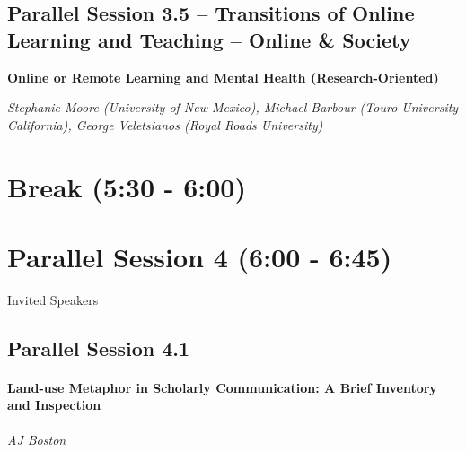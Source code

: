 \documentclass[
]{book}
\begin{document}
\hypertarget{parallel-session-3.5-transitions-of-online-learning-and-teaching-online-society}{%
\subsection*{Parallel Session 3.5 -- Transitions of Online Learning and Teaching -- Online \& Society}\label{parallel-session-3.5-transitions-of-online-learning-and-teaching-online-society}}

\begin{secondary}
\textbf{Online or Remote Learning and Mental Health (Research-Oriented)}

\emph{Stephanie Moore (University of New Mexico), Michael Barbour (Touro
University California), George Veletsianos (Royal Roads University)}
\end{secondary}

\hypertarget{break-530---600}{%
\section*{Break (5:30 - 6:00)}\label{break-530---600}}

\hypertarget{parallel-session-4-600---645}{%
\section*{Parallel Session 4 (6:00 - 6:45)}\label{parallel-session-4-600---645}}

Invited Speakers

\hypertarget{parallel-session-4.1}{%
\subsection*{Parallel Session 4.1}\label{parallel-session-4.1}}

\begin{reflect}
\hypertarget{land-use-metaphor-in-scholarly-communication-a-brief-inventory-and-inspection}{%
\paragraph*{Land-use Metaphor in Scholarly Communication: A Brief
Inventory and
Inspection}\label{land-use-metaphor-in-scholarly-communication-a-brief-inventory-and-inspection}}

\emph{AJ Boston}
\end{reflect}
\end{document}
